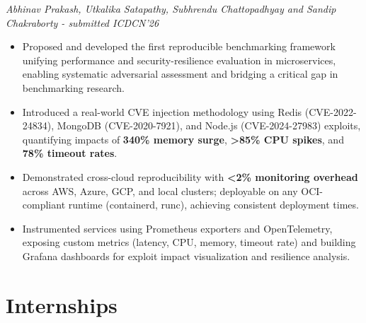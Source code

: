 \documentclass[11pt,a4paper]{article}
\begin{document}
\textit{Abhinav Prakash, Utkalika Satapathy, Subhrendu Chattopadhyay and Sandip Chakraborty - submitted ICDCN'26}
{\footnotesize
\begin{itemize}
    \item Proposed and developed the first reproducible benchmarking framework unifying performance and security-resilience evaluation in microservices, enabling systematic adversarial assessment and bridging a critical gap in benchmarking research.

    \item Introduced a real-world CVE injection methodology using Redis (CVE-2022-24834), MongoDB (CVE-2020-7921), and Node.js (CVE-2024-27983) exploits, quantifying impacts of \textbf{340\% memory surge}, \textbf{>85\% CPU spikes}, and \textbf{78\% timeout rates}.

    \item Demonstrated cross-cloud reproducibility with \textbf{<2\% monitoring overhead} across AWS, Azure, GCP, and local clusters; deployable on any OCI-compliant runtime (containerd, runc), achieving consistent deployment times.

    \item Instrumented services using Prometheus exporters and OpenTelemetry, exposing custom metrics (latency, CPU, memory, timeout rate) and building Grafana dashboards for exploit impact visualization and resilience analysis.

\end{itemize}
}
\section*{Internships}
\end{document}
